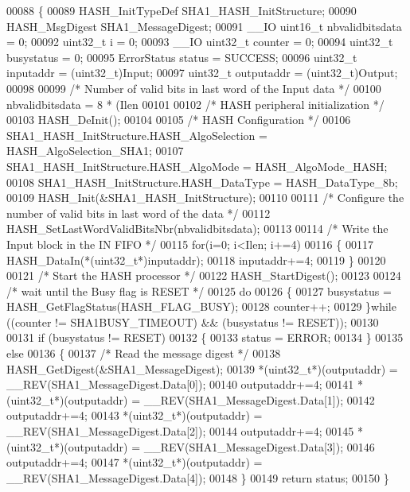 \begin{DoxyCode}
00088 \{
00089   HASH_InitTypeDef SHA1\_HASH\_InitStructure;
00090   HASH_MsgDigest SHA1\_MessageDigest;
00091   \_\_IO uint16\_t nbvalidbitsdata = 0;
00092   uint32\_t i = 0;
00093   \_\_IO uint32\_t counter = 0;
00094   uint32\_t busystatus = 0;
00095   ErrorStatus status = SUCCESS;
00096   uint32\_t inputaddr  = (uint32\_t)Input;
00097   uint32\_t outputaddr = (uint32\_t)Output;
00098 
00099   \textcolor{comment}{/* Number of valid bits in last word of the Input data */}
00100   nbvalidbitsdata = 8 * (Ilen %
00101 
00102   \textcolor{comment}{/* HASH peripheral initialization */}
00103   HASH_DeInit();
00104 
00105   \textcolor{comment}{/* HASH Configuration */}
00106   SHA1\_HASH\_InitStructure.HASH_AlgoSelection = HASH_AlgoSelection_SHA1;
00107   SHA1\_HASH\_InitStructure.HASH_AlgoMode = HASH_AlgoMode_HASH;
00108   SHA1\_HASH\_InitStructure.HASH_DataType = HASH_DataType_8b;
00109   HASH_Init(&SHA1\_HASH\_InitStructure);
00110 
00111   \textcolor{comment}{/* Configure the number of valid bits in last word of the data */}
00112   HASH_SetLastWordValidBitsNbr(nbvalidbitsdata);
00113 
00114   \textcolor{comment}{/* Write the Input block in the IN FIFO */}
00115   \textcolor{keywordflow}{for}(i=0; i<Ilen; i+=4)
00116   \{
00117     HASH_DataIn(*(uint32\_t*)inputaddr);
00118     inputaddr+=4;
00119   \}
00120 
00121   \textcolor{comment}{/* Start the HASH processor */}
00122   HASH_StartDigest();
00123 
00124   \textcolor{comment}{/* wait until the Busy flag is RESET */}
00125   \textcolor{keywordflow}{do}
00126   \{
00127     busystatus = HASH_GetFlagStatus(HASH_FLAG_BUSY);
00128     counter++;
00129   \}\textcolor{keywordflow}{while} ((counter != SHA1BUSY_TIMEOUT) && (busystatus != RESET));
00130 
00131   \textcolor{keywordflow}{if} (busystatus != RESET)
00132   \{
00133      status = ERROR;
00134   \}
00135   \textcolor{keywordflow}{else}
00136   \{
00137     \textcolor{comment}{/* Read the message digest */}
00138     HASH_GetDigest(&SHA1\_MessageDigest);
00139     *(uint32\_t*)(outputaddr)  = \_\_REV(SHA1\_MessageDigest.Data[0]);
00140     outputaddr+=4;
00141     *(uint32\_t*)(outputaddr)  = \_\_REV(SHA1\_MessageDigest.Data[1]);
00142     outputaddr+=4;
00143     *(uint32\_t*)(outputaddr)  = \_\_REV(SHA1\_MessageDigest.Data[2]);
00144     outputaddr+=4;
00145     *(uint32\_t*)(outputaddr)  = \_\_REV(SHA1\_MessageDigest.Data[3]);
00146     outputaddr+=4;
00147     *(uint32\_t*)(outputaddr)  = \_\_REV(SHA1\_MessageDigest.Data[4]);
00148   \}
00149   \textcolor{keywordflow}{return} status;
00150 \}
\end{DoxyCode}
\mbox{\label{group__HASH__Group6_ga2e38e900ca7838c1cea17cef19953a5e}} 
